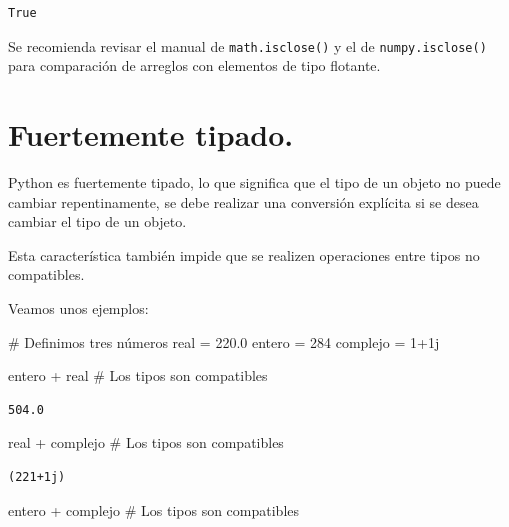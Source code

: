 \documentclass[
  spanish,
  letterpaper,
]{scrbook}
\newenvironment{Shaded}{\begin{snugshade}}{\end{snugshade}}
\newcommand{\CommentTok}[1]{\textcolor[rgb]{0.37,0.37,0.37}{#1}}
\newcommand{\DecValTok}[1]{\textcolor[rgb]{0.68,0.00,0.00}{#1}}
\newcommand{\FloatTok}[1]{\textcolor[rgb]{0.68,0.00,0.00}{#1}}
\newcommand{\NormalTok}[1]{\textcolor[rgb]{0.00,0.23,0.31}{#1}}
\newcommand{\OperatorTok}[1]{\textcolor[rgb]{0.37,0.37,0.37}{#1}}
\newcommand{\OtherTok}[1]{\textcolor[rgb]{0.00,0.23,0.31}{#1}}
\theoremstyle{definition}
\theoremstyle{remark}
\begin{document}
\begin{verbatim}
True
\end{verbatim}

Se recomienda revisar el manual de \texttt{math.isclose()} y el de
\texttt{numpy.isclose()} para comparación de arreglos con elementos de
tipo flotante.

\section{Fuertemente tipado.}\label{fuertemente-tipado.}

Python es fuertemente tipado, lo que significa que el tipo de un objeto
no puede cambiar repentinamente, se debe realizar una conversión
explícita si se desea cambiar el tipo de un objeto.

Esta característica también impide que se realizen operaciones entre
tipos no compatibles.

Veamos unos ejemplos:

\begin{Shaded}
\begin{Highlighting}[]
\CommentTok{\# Definimos tres números}
\NormalTok{real   }\OperatorTok{=} \FloatTok{220.0}  
\NormalTok{entero }\OperatorTok{=} \DecValTok{284}
\NormalTok{complejo }\OperatorTok{=} \DecValTok{1}\OperatorTok{+}\OtherTok{1j}
\end{Highlighting}
\end{Shaded}

\begin{Shaded}
\begin{Highlighting}[]
\NormalTok{entero }\OperatorTok{+}\NormalTok{ real }\CommentTok{\# Los tipos son compatibles}
\end{Highlighting}
\end{Shaded}

\begin{verbatim}
504.0
\end{verbatim}

\begin{Shaded}
\begin{Highlighting}[]
\NormalTok{real }\OperatorTok{+}\NormalTok{ complejo }\CommentTok{\# Los tipos son compatibles}
\end{Highlighting}
\end{Shaded}

\begin{verbatim}
(221+1j)
\end{verbatim}

\begin{Shaded}
\begin{Highlighting}[]
\NormalTok{entero }\OperatorTok{+}\NormalTok{ complejo }\CommentTok{\# Los tipos son compatibles}
\end{Highlighting}
\end{Shaded}
\end{document}
